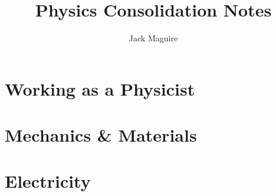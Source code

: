 \documentclass{report}
\title{\huge{Physics Consolidation Notes}}
\author{\huge{Jack Maguire}}
\date{}
\begin{document}
\maketitle

\tableofcontents
\pagebreak


\part{Working as a Physicist}


\part{Mechanics \& Materials}


\part{Electricity}

\end{document}
